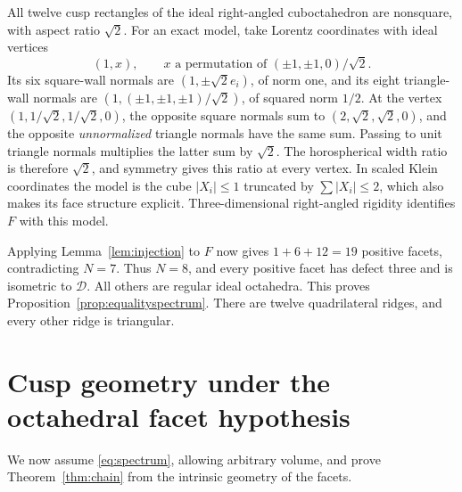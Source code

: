 \documentclass[11pt]{article}
\theoremstyle{remark}
\newcommand{\DBL}{\mathcal D}
\begin{document}
All twelve cusp rectangles of the ideal right-angled cuboctahedron
are nonsquare, with aspect ratio $\sqrt2$. For an exact model, take
Lorentz coordinates with ideal vertices
\[
 (1,x),\qquad
 x\text{ a permutation of }(\pm1,\pm1,0)/\sqrt2.
\]
Its six square-wall normals are $(1,\pm\sqrt2 e_i)$, of norm one,
and its eight triangle-wall normals are
$(1,(\pm1,\pm1,\pm1)/\sqrt2)$, of squared norm $1/2$.
At the vertex $(1,1/\sqrt2,1/\sqrt2,0)$, the opposite square
normals sum to $(2,\sqrt2,\sqrt2,0)$, and the opposite
\emph{unnormalized} triangle normals have the same sum. Passing to
unit triangle normals multiplies the latter sum by $\sqrt2$.
The horospherical width ratio is therefore $\sqrt2$, and symmetry
gives this ratio at every vertex. In scaled Klein coordinates the
model is the cube $|X_i|\le1$ truncated by
$\sum|X_i|\le2$, which also makes its face structure explicit.
Three-dimensional right-angled rigidity identifies $F$ with this
model.

Applying Lemma~\ref{lem:injection} to $F$ now gives
$1+6+12=19$ positive facets, contradicting $N=7$. Thus $N=8$,
and every positive facet has defect three and is isometric to
$\DBL$. All others are regular ideal octahedra. This proves
Proposition~\ref{prop:equalityspectrum}. There are twelve
quadrilateral ridges, and every other ridge is triangular.

\section{Cusp geometry under the octahedral facet hypothesis}\label{sec:chainproof}
We now assume \eqref{eq:spectrum}, allowing arbitrary volume, and
prove Theorem~\ref{thm:chain} from the intrinsic geometry of the facets.
\end{document}
